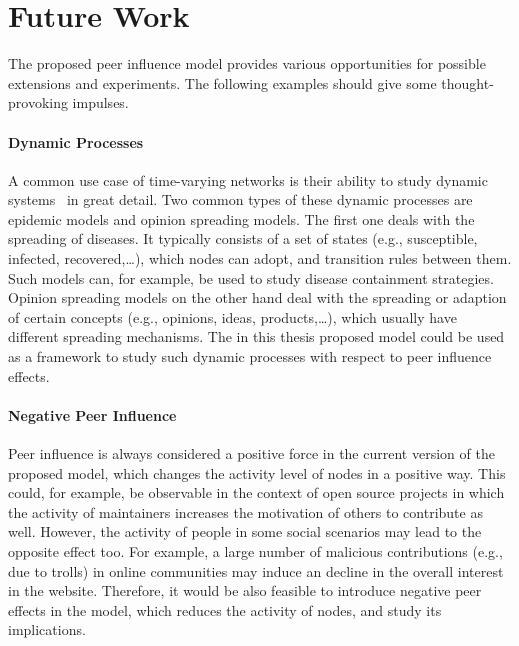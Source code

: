 

\section{Future Work}
\label{sec:future-work}

The proposed peer influence model provides various opportunities for possible extensions and experiments.
The following examples should give some thought-provoking impulses.

\paragraph{Dynamic Processes}
A common use case of time-varying networks is their ability to study dynamic systems~\cite{Holme2015} in great detail.
Two common types of these dynamic processes are epidemic models and opinion spreading models.
The first one deals with the spreading of diseases.
It typically consists of a set of states (e.g., susceptible, infected, recovered,\ldots), which nodes can adopt, and transition rules between them.
Such models can, for example, be used to study disease containment strategies.
Opinion spreading models on the other hand deal with the spreading or adaption of certain concepts (e.g., opinions, ideas, products,\ldots), which usually have different spreading mechanisms.
The in this thesis proposed model could be used as a framework to study such dynamic processes with respect to peer influence effects.

\paragraph{Negative Peer Influence}
Peer influence is always considered a positive force in the current version of the proposed model, which changes the activity level of nodes in a positive way.
This could, for example, be observable in the context of open source projects in which the activity of maintainers increases the motivation of others to contribute as well.
However, the activity of people in some social scenarios may lead to the opposite effect too.
For example, a large number of malicious contributions (e.g., due to trolls) in online communities may induce an decline in the overall interest in the website.
Therefore, it would be also feasible to introduce negative peer effects in the model, which reduces the activity of nodes, and study its implications.

